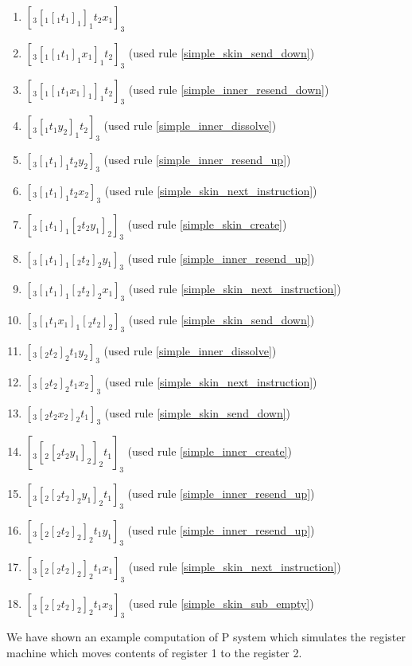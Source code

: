 \begin{example}
      \begin{enumerate}
        \item $[_3 [_1 [_1 t_1 ]_1 ]_1 t_2 x_1 ]_3$
        \item $[_3 [_1 [_1 t_1 ]_1 x_1 ]_1 t_2 ]_3$ (used rule \ref{simple_skin_send_down})
        \item $[_3 [_1 [_1 t_1 x_1 ]_1 ]_1 t_2 ]_3$ (used rule \ref{simple_inner_resend_down})
        \item $[_3 [_1 t_1 y_2 ]_1 t_2 ]_3$ (used rule \ref{simple_inner_dissolve})
        \item $[_3 [_1 t_1 ]_1 t_2 y_2 ]_3$ (used rule \ref{simple_inner_resend_up})
        \item $[_3 [_1 t_1 ]_1 t_2 x_2 ]_3$ (used rule \ref{simple_skin_next_instruction})
        \item $[_3 [_1 t_1 ]_1 [_2 t_2 y_1 ]_2 ]_3$ (used rule \ref{simple_skin_create})
        \item $[_3 [_1 t_1 ]_1 [_2 t_2 ]_2 y_1 ]_3$ (used rule \ref{simple_inner_resend_up})
        \item $[_3 [_1 t_1 ]_1 [_2 t_2 ]_2 x_1 ]_3$ (used rule \ref{simple_skin_next_instruction})
        \item $[_3 [_1 t_1 x_1 ]_1 [_2 t_2 ]_2 ]_3$ (used rule \ref{simple_skin_send_down})
        \item $[_3 [_2 t_2 ]_2 t_1 y_2 ]_3$ (used rule \ref{simple_inner_dissolve})
        \item $[_3 [_2 t_2 ]_2 t_1 x_2 ]_3$ (used rule \ref{simple_skin_next_instruction})
        \item $[_3 [_2 t_2 x_2 ]_2 t_1 ]_3$ (used rule \ref{simple_skin_send_down})
        \item $[_3 [_2 [_2 t_2 y_1 ]_2 ]_2 t_1 ]_3$ (used rule \ref{simple_inner_create})
        \item $[_3 [_2 [_2 t_2 ]_2 y_1 ]_2 t_1 ]_3$ (used rule \ref{simple_inner_resend_up})
        \item $[_3 [_2 [_2 t_2 ]_2 ]_2 t_1 y_1 ]_3$ (used rule \ref{simple_inner_resend_up})
        \item $[_3 [_2 [_2 t_2 ]_2 ]_2 t_1 x_1 ]_3$ (used rule \ref{simple_skin_next_instruction})
        \item $[_3 [_2 [_2 t_2 ]_2 ]_2 t_1 x_3 ]_3$ (used rule \ref{simple_skin_sub_empty})
      \end{enumerate}

      We have shown an example computation of P system which simulates the register machine which moves contents of register 1 to the register 2.
    \end{example}

